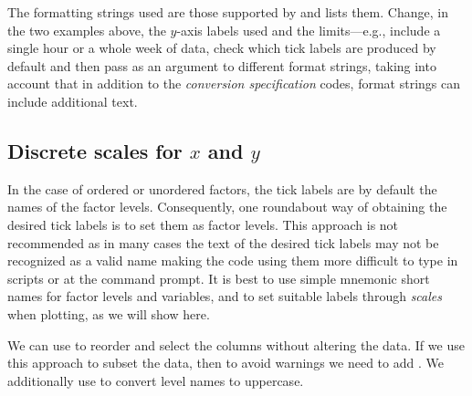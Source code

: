 \documentclass[krantz2]{krantz}\usepackage{knitr}
\begin{document}
\begin{playground}
The formatting strings used are those supported by  and  lists them. Change, in the two examples above, the $y$-axis labels used and the limits---e.g., include a single hour or a whole week of data, check which tick labels are produced by default and then pass as an argument to  different format strings, taking into account that in addition to the \emph{conversion specification} codes, format strings can include additional text.
\end{playground}

\subsection{Discrete scales for $x$ and $y$}

In the case of ordered or unordered factors, the tick labels are by default the names of the factor levels. Consequently, one roundabout way of obtaining the desired tick labels is to set them as factor levels. This approach is not recommended as in many cases the text of the desired tick labels may not be recognized as a valid name making the code using them more difficult to type in scripts or at the command prompt. It is best to use simple mnemonic short names for factor levels and variables, and to set suitable labels through \emph{scales} when plotting, as we will show here.

We can use  to reorder and select the columns without altering the data. If we use this approach to subset the data, then to avoid warnings we need to add . We additionally use  to convert level names to uppercase.
\end{document}
